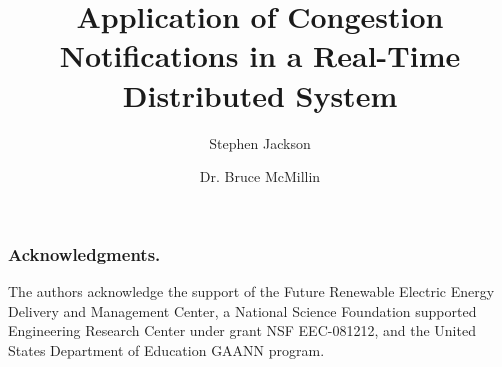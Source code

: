 \documentclass{llncs}
\begin{document}
%
\frontmatter          %
%
\pagestyle{headings}  %
%
\mainmatter
\title{Application of Congestion Notifications in a Real-Time Distributed System}
%
%
\author{Stephen Jackson \and Dr. Bruce McMillin }
%
%
%

\maketitle              %



\begin{abstract}


\end{abstract}








\subsubsection*{Acknowledgments.}

The authors acknowledge the support of the Future Renewable
Electric Energy Delivery and Management Center,
a National Science Foundation supported Engineering Research
Center under grant NSF EEC-081212, and the United States Department of Education GAANN program.

%
%


%
\end{document}
